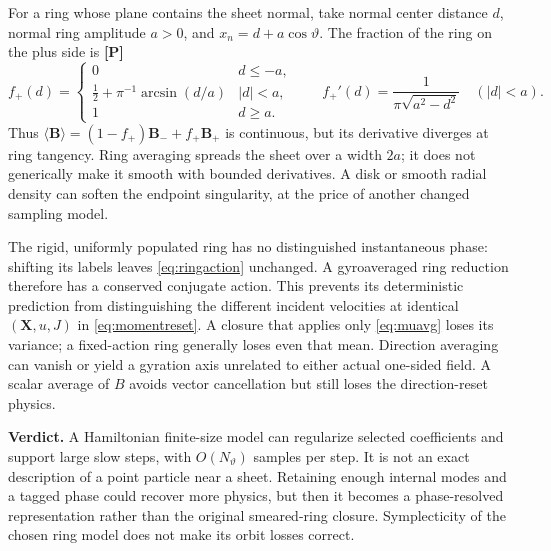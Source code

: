 \documentclass[10pt,a4paper]{article}
\newcommand{\B}{\mathbf B}\newcommand{\bunit}{\mathbf b}
\newcommand{\X}{\mathbf X}\newcommand{\n}{\mathbf n}
\newcommand{\avg}[1]{\langle #1\rangle}
\newcommand{\proved}{\textbf{[P]}}
\begin{document}
For a ring whose plane contains the sheet normal, take normal center distance $d$, normal ring amplitude $a>0$, and $x_n=d+a\cos\vartheta$. The fraction of the ring on the plus side is \proved{}
\begin{equation}\label{eq:ringfraction}
 f_+(d)=\begin{cases}0&d\le-a,\\
 \tfrac12+\pi^{-1}\arcsin(d/a)&|d|<a,\\
 1&d\ge a.\end{cases}
 \qquad f_+'(d)=\frac{1}{\pi\sqrt{a^2-d^2}}\quad(|d|<a).
\end{equation}
Thus $\avg{\B}=(1-f_+)\B_-+f_+\B_+$ is continuous, but its derivative diverges at ring tangency. Ring averaging spreads the sheet over a width $2a$; it does not generically make it smooth with bounded derivatives. A disk or smooth radial density can soften the endpoint singularity, at the price of another changed sampling model.

The rigid, uniformly populated ring has no distinguished instantaneous phase: shifting its labels leaves \eqref{eq:ringaction} unchanged. A gyroaveraged ring reduction therefore has a conserved conjugate action. This prevents its deterministic prediction from distinguishing the different incident velocities at identical $(\X,u,J)$ in \eqref{eq:momentreset}. A closure that applies only \eqref{eq:muavg} loses its variance; a fixed-action ring generally loses even that mean. Direction averaging can vanish or yield a gyration axis unrelated to either actual one-sided field. A scalar average of $B$ avoids vector cancellation but still loses the direction-reset physics.

\textbf{Verdict.} A Hamiltonian finite-size model can regularize selected coefficients and support large slow steps, with $O(N_\vartheta)$ samples per step. It is not an exact description of a point particle near a sheet. Retaining enough internal modes and a tagged phase could recover more physics, but then it becomes a phase-resolved representation rather than the original smeared-ring closure. Symplecticity of the chosen ring model does not make its orbit losses correct.
\end{document}
